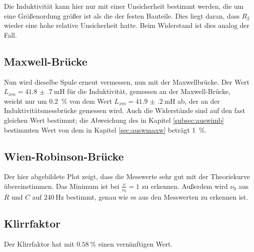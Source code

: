 Die Induktivität kann hier nur mit einer Unsicherheit bestimmt werden, die
um eine Größenordung größer ist als die der festen Bauteile. Dies liegt daran, dass
$R_2$ wieder eine hohe relative Unsicherheit hatte. Beim Widerstand ist dies analog
der Fall.

\subsection{Maxwell-Brücke}

Nun wird dieselbe Spule erneut vermessen, nun mit der Maxwellbrücke. Der Wert
$L_{xm} = \SI{41.8(7)}{\milli\henry}$ für
die Induktivität, gemessen an der Maxwell-Brücke, weicht nur um \SI{0.2}{\percent}
von dem Wert $L_{xm} = \SI{41.9(2)}{\milli\henry}$ ab, der an der
Induktivitätsmessbrücke gemessen wird. Auch die Widerstände sind auf den fast gleichen Wert
bestimmt; die Abweichung des in Kapitel \ref{subsec:auswimb} bestimmten Wert von dem
in Kapitel \ref{sec:auswmaxw} beträgt \SI{1}{\percent}.

\subsection{Wien-Robinson-Brücke}

Der hier abgebildete Plot zeigt, dass die Messwerte sehr gut mit der Theoriekurve
übereinstimmen. Das Minimum ist bei $\frac{\nu}{\nu_0} = 1$ zu erkennen.
Außerdem wird $\nu_0$ aus $R$ und $C$ auf $\SI{240}{\hertz}$ bestimmt, genau wie
es aus den Messwerten zu erkennen ist.

\subsection{Klirrfaktor}

Der Klirrfaktor hat mit $\SI{0.58}{\percent}$ einen vernünftigen Wert.
